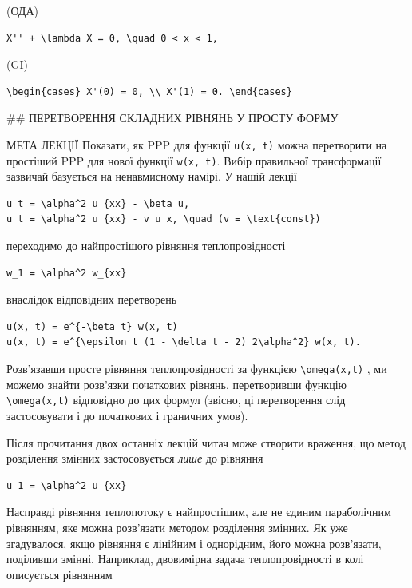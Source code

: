 \documentclass[
  ukrainian,
]{article}
\begin{document}
(ОДА)

\begin{verbatim}
X'' + \lambda X = 0, \quad 0 < x < 1,
\end{verbatim}

(GI)

\begin{verbatim}
\begin{cases} X'(0) = 0, \\ X'(1) = 0. \end{cases}
\end{verbatim}

\#\# ПЕРЕТВОРЕННЯ СКЛАДНИХ РІВНЯНЬ У ПРОСТУ ФОРМУ

МЕТА ЛЕКЦІЇ Показати, як PPP для функції \texttt{u(x,\ t)} можна
перетворити на простіший PPP для нової функції \texttt{w(x,\ t)}. Вибір
правильної трансформації зазвичай базується на ненавмисному намірі. У
нашій лекції

\begin{verbatim}
u_t = \alpha^2 u_{xx} - \beta u,
u_t = \alpha^2 u_{xx} - v u_x, \quad (v = \text{const})
\end{verbatim}

переходимо до найпростішого рівняння теплопровідності

\begin{verbatim}
w_1 = \alpha^2 w_{xx}
\end{verbatim}

внаслідок відповідних перетворень

\begin{verbatim}
u(x, t) = e^{-\beta t} w(x, t)
u(x, t) = e^{\epsilon t (1 - \delta t - 2) 2\alpha^2} w(x, t).
\end{verbatim}

Розв'язавши просте рівняння теплопровідності за функцією
\texttt{\textbackslash{}omega(x,t)} , ми можемо знайти розв'язки
початкових рівнянь, перетворивши функцію
\texttt{\textbackslash{}omega(x,t)} відповідно до цих формул (звісно, ці
перетворення слід застосовувати і до початкових і граничних умов).

Після прочитання двох останніх лекцій читач може створити враження, що
метод розділення змінних застосовується \emph{лише} до рівняння

\begin{verbatim}
u_1 = \alpha^2 u_{xx}
\end{verbatim}

Насправді рівняння теплопотоку є найпростішим, але не єдиним
параболічним рівнянням, яке можна розв'язати методом розділення змінних.
Як уже згадувалося, якщо рівняння є лінійним і однорідним, його можна
розв'язати, поділивши змінні. Наприклад, двовимірна задача
теплопровідності в колі описується рівнянням
\end{document}
